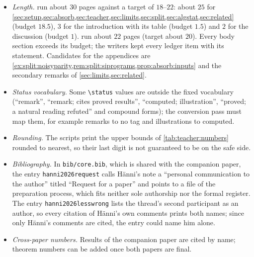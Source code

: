 \begin{itemize}
\item \emph{Length.}  run about $30$ pages against a target of $18$--$22$: about $25$ for \cref{sec:setup,sec:absorb,sec:teacher,sec:limits,sec:split,sec:algstat,sec:related} (budget $18.5$), $3$ for the introduction with its table (budget $1.5$) and $2$ for the discussion (budget $1$).  run about $22$ pages (target about $20$). Every body section exceeds its budget; the writers kept every ledger item with its statement. Candidates for the appendices are \cref{ex:split:noisyparity,rem:split:siprograms,prop:absorb:inputs} and the secondary remarks of \cref{sec:limits,sec:related}.
\item \emph{Status vocabulary.} Some \texttt{\textbackslash status} values are outside the fixed vocabulary (``remark'', ``remark; cites proved results'', ``computed; illustration'', ``proved; a natural reading refuted'' and compound forms); the conversion pass must map them, for example remarks to no tag and illustrations to computed.
\item \emph{Rounding.} The scripts print the upper bounds of \cref{tab:teacher:numbers} rounded to nearest, so their last digit is not guaranteed to be on the safe side.
\item \emph{Bibliography.} In \texttt{bib/core.bib}, which is shared with the companion paper, the entry \texttt{hanni2026\allowbreak request} calls H\"anni's note a ``personal communication to the author'' titled ``Request for a paper'' and points to a file of the preparation process, which fits neither sole authorship nor the formal register. The entry \texttt{hanni2026lesswrong} lists the thread's second participant as an author, so every citation of H\"anni's own comments prints both names; since only H\"anni's comments are cited, the entry could name him alone.
\item \emph{Cross-paper numbers.} Results of the companion paper are cited by name; theorem numbers can be added once both papers are final.
\end{itemize}
